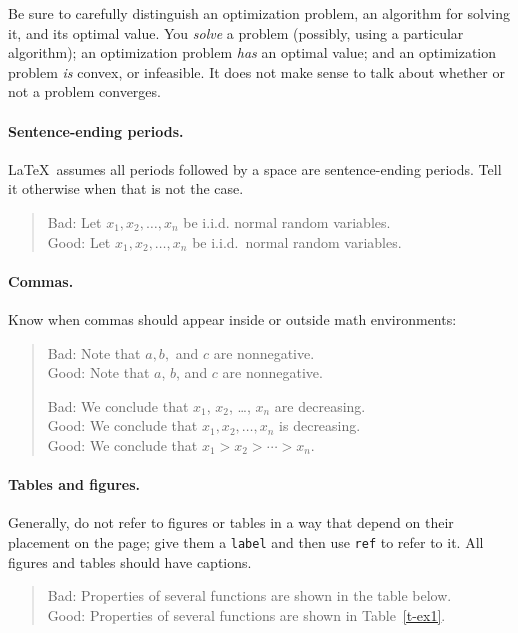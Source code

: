 \documentclass[12pt]{article}
\begin{document}
Be sure to carefully distinguish an optimization problem, 
an algorithm for solving it, and its optimal value.
You \emph{solve} a problem (possibly, using a particular algorithm);
an optimization problem \emph{has} an optimal value;
and an optimization problem \emph{is} convex, or infeasible.
It does not make sense to talk about whether or not a problem converges.

\paragraph{Sentence-ending periods.}
\LaTeX\ assumes all periods followed by a space are sentence-ending periods.
Tell it otherwise when that is not the case.
\begin{quote}
Bad: Let $x_1,x_2,\ldots ,x_n$ be  i.i.d. normal random variables.\\
Good: Let $x_1,x_2,\ldots ,x_n$ be  i.i.d.\ normal random variables.
\end{quote}

\paragraph{Commas.}
Know when commas should appear inside or outside math environments:
\begin{quote}
Bad: Note that $a,b,$ and $c$ are nonnegative.\\
Good: Note that $a$, $b$, and $c$ are nonnegative.

Bad: We conclude that $x_1$, $x_2$, \dots, $x_n$ are decreasing.\\
Good: We conclude that $x_1, x_2, \ldots, x_n$ is decreasing.\\
Good: We conclude that $x_1>x_2> \cdots >x_n$.
\end{quote}

\paragraph{Tables and figures.}
Generally, do not refer to figures or tables in a
way that depend on their placement on the page; give them a \texttt{label}
and then use \texttt{ref} to refer to it. All figures and tables should have
captions.
\begin{quote}
Bad: Properties of several functions are shown in the table below.\\
Good: Properties of several functions are shown in Table~\ref{t-ex1}.
\end{quote}
\end{document}
